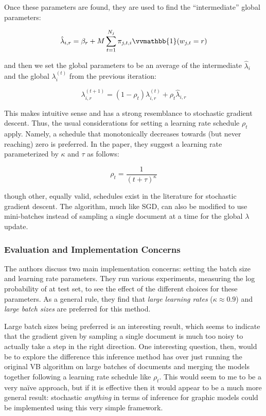 \documentclass[11pt]{article}
\newcommand{\indicator}{\vvmathbb{1}}
\begin{document}
Once these parameters are found, they are used to find the ``intermediate''
global parameters:

\begin{equation}
\hat{\lambda}_{i,r} = \beta_r + M \sum_{t=1}^{N_j}
\pi_{j,t,i}\indicator(w_{j,t} = r)
\end{equation}

and then we set the global parameters to be an average of the intermediate
$\hat{\lambda}_i$ and the global $\lambda_i^{(t)}$ from the previous
iteration:

\begin{equation}
  \lambda_{i,r}^{(t+1)} = (1-\rho_t)\lambda_{i,r}^{(t)} +
  \rho_t\hat{\lambda}_{i,r}
\end{equation}

This makes intuitive sense and has a strong resemblance to stochastic
gradient descent. Thus, the usual considerations for setting a learning
rate schedule $\rho_t$ apply. Namely, a schedule that monotonically
decreases towards (but never reaching) zero is preferred. In the paper,
they suggest a learning rate parameterized by $\kappa$ and $\tau$ as
follows:

\begin{equation}
  \rho_t = \frac{1}{(t+\tau)^\kappa}
\end{equation}

though other, equally valid, schedules exist in the literature for
stochastic gradient descent. The algorithm, much like SGD, can also be
modified to use mini-batches instead of sampling a single document at a
time for the global $\lambda$ update.

\subsubsection{Evaluation and Implementation Concerns}

The authors discuss two main implementation concerns: setting the batch
size and learning rate parameters. They run various experiments, measuring
the log probability of at test set, to see the effect of the different
choices for these parameters. As a general rule, they find that \emph{large
learning rates} ($\kappa \approx 0.9$) and \emph{large batch sizes} are
preferred for this method.

Large batch sizes being preferred is an interesting result, which seems to
indicate that the gradient given by sampling a single document is much too
noisy to actually take a step in the right direction. One interesting
question, then, would be to explore the difference this inference method
has over just running the original VB algorithm on large batches of
documents and merging the models together following a learning rate
schedule like $\rho_t$. This would seem to me to be a very na\"ive
approach, but if it is effective then it would appear to be a much more
general result: stochastic \emph{anything} in terms of inference for
graphic models could be implemented using this very simple framework.
\end{document}
